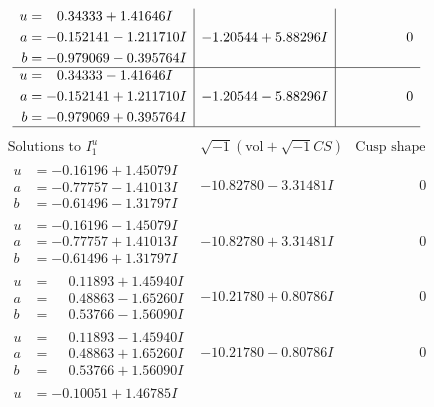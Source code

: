 \documentclass[1p]{elsarticle_modified}
\theoremstyle{definition}
\newcommand{\I}{\sqrt{-1}}
\begin{document}
$$\begin{array}{c|c|c}
\begin{aligned}
u &= \phantom{-}0.34333 + 1.41646 I \\
a &= -0.152141 - 1.211710 I \\
b &= -0.979069 - 0.395764 I\end{aligned}
 & -1.20544 + 5.88296 I & \phantom{-0.000000 } 0 \\ \hline\begin{aligned}
u &= \phantom{-}0.34333 - 1.41646 I \\
a &= -0.152141 + 1.211710 I \\
b &= -0.979069 + 0.395764 I\end{aligned}
 & -1.20544 - 5.88296 I & \phantom{-0.000000 } 0\\
 \hline 
 \end{array}$$\newpage$$\begin{array}{c|c|c}  
\text{Solutions to }I^u_{1}& \I (\text{vol} + \sqrt{-1}CS) & \text{Cusp shape}\\
 \hline 
\begin{aligned}
u &= -0.16196 + 1.45079 I \\
a &= -0.77757 - 1.41013 I \\
b &= -0.61496 - 1.31797 I\end{aligned}
 & -10.82780 - 3.31481 I & \phantom{-0.000000 } 0 \\ \hline\begin{aligned}
u &= -0.16196 - 1.45079 I \\
a &= -0.77757 + 1.41013 I \\
b &= -0.61496 + 1.31797 I\end{aligned}
 & -10.82780 + 3.31481 I & \phantom{-0.000000 } 0 \\ \hline\begin{aligned}
u &= \phantom{-}0.11893 + 1.45940 I \\
a &= \phantom{-}0.48863 - 1.65260 I \\
b &= \phantom{-}0.53766 - 1.56090 I\end{aligned}
 & -10.21780 + 0.80786 I & \phantom{-0.000000 } 0 \\ \hline\begin{aligned}
u &= \phantom{-}0.11893 - 1.45940 I \\
a &= \phantom{-}0.48863 + 1.65260 I \\
b &= \phantom{-}0.53766 + 1.56090 I\end{aligned}
 & -10.21780 - 0.80786 I & \phantom{-0.000000 } 0 \\ \hline\begin{aligned}
u &= -0.10051 + 1.46785 I \\

\end{aligned}
\end{array}$$
\end{document}
